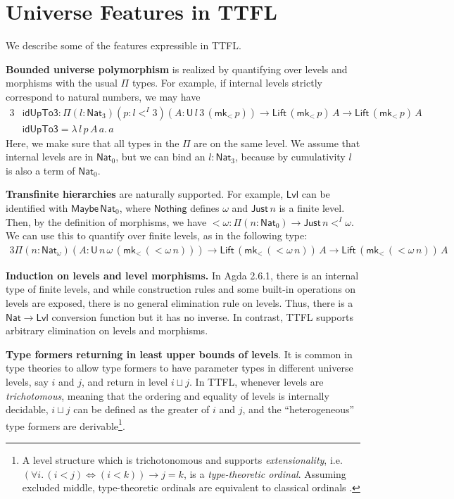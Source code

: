 \documentclass[a4paper,UKenglish,cleveref, autoref, thm-restate]{lipics-v2021}
\theoremstyle{remark}
\theoremstyle{definition}
\newcommand{\U}{\mathsf{U}}
\newcommand{\Nat}{\mathsf{Nat}}
\newcommand{\Lift}{\mathsf{Lift}}
\newcommand{\Lvl}{\mathsf{Lvl}}
\renewcommand{\U}{\mathsf{U}}
\newcommand{\msf}[1]{\mathsf{#1}}
\newcommand{\mkMor}{\msf{mk}\!_<}
\begin{document}
\section{Universe Features in TTFL}

We describe some of the features expressible in TTFL.

\textbf{Bounded universe polymorphism} is realized by quantifying
over levels and morphisms with the usual $\Pi$ types. For example, if internal
levels strictly correspond to natural numbers, we may have
\begin{alignat*}{3}
  &\msf{idUpTo3} : \Pi(l : \Nat_3)(p : l <^I 3)(A : \U\,l\,3\,(\mkMor\,p)) \to \Lift\,(\mkMor\,p)\,A \to \Lift\,(\mkMor\,p)\,A\\
  &\msf{idUpTo3} = \lambda\,l\,p\,A\,a.\,a
\end{alignat*}
Here, we make sure that all types in the $\Pi$ are on the same level. We assume
that internal levels are in $\Nat_0$, but we can bind an $l : \Nat_3$, because
by cumulativity $l$ is also a term of $\Nat_0$.

\textbf{Transfinite hierarchies} are naturally supported. For example, $\Lvl$
can be identified with $\msf{Maybe}\,\Nat_0$, where $\msf{Nothing}$ defines
$\omega$ and $\msf{Just}\,n$ is a finite level. Then, by the definition of
morphisms, we have $<\!\omega : \Pi(n : \Nat_0) \to \msf{Just}\,n <^I \omega$.
We can use this to quantify over finite levels, as in the following type:
\begin{alignat*}{3}
  \Pi(n : \Nat_{\omega})(A : \U\,n\,\omega\,(\mkMor\,(<\!\omega\,n))) \to \Lift\,(\mkMor\,(<\!\omega\,n))\,A \to \Lift\,(\mkMor\,(<\!\omega\,n))\,A
\end{alignat*}

\textbf{Induction on levels and level morphisms.} In Agda 2.6.1, there is an
internal type of finite levels, and while construction rules and some built-in
operations on levels are exposed, there is no general elimination rule on
levels. Thus, there is a $\Nat \to \Lvl$ conversion function but it has no
inverse. In contrast, TTFL supports arbitrary elimination on levels and
morphisms.

\textbf{Type formers returning in least upper bounds of levels}. It is common in
type theories to allow type formers to have parameter types in different
universe levels, say $i$ and $j$, and return in level $i \sqcup j$. In TTFL,
whenever levels are \emph{trichotomous}, meaning that the ordering and equality
of levels is internally decidable, $i \sqcup j$ can be defined as the greater of
$i$ and $j$, and the ``heterogeneous'' type formers are derivable\footnote{A
level structure which is trichotonomous and supports \emph{extensionality},
i.e.\ $(\forall i.\, (i < j) \iff (i < k)) \to j = k$, is a
\emph{type-theoretic ordinal}. Assuming excluded middle, type-theoretic
ordinals are equivalent to classical ordinals \cite[Section 10.3]{hottbook}.}.
\end{document}
